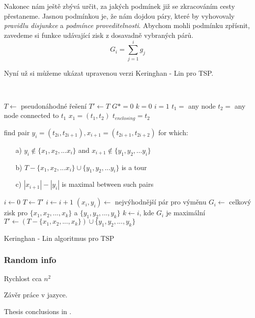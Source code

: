 \documentclass[
  biblatex,
  figures=false,
  glossaries,
  index
]{kidiplom}
\begin{document}
Nakonec nám ještě zbývá určit, za jakých podmínek již se zkracováním cesty přestaneme. Jasnou podmínkou je, že nám dojdou páry, které by vyhovovaly \textit{pravidlu disjunkce} a \textit{podmínce proveditelnosti}. Abychom mohli podmínku zpřísnit, zavedeme si funkce udávající zisk z dosavadně vybraných párů.
$$G_i = \sum_{j=1}^{i}g_j$$

Nyní už si můžeme ukázat upravenou verzi Keringhan - Lin pro TSP.
\newline

{\LinesNumbered\SetAlgoNoLine\
\begin{algorithm}[H]
%
$T \leftarrow$ pseudonáhodné řešení\;
$T' \leftarrow T$\;
$G* = 0$\;
$k = 0$
$i = 1$\;
$t_1 =$ any node\;
$t_2 =$ any node connected to $t_1$\;
$x_1 = (t_1, t_2)$\;
$t_{enclosing} = t_2$\;
{
find pair $y_i = (t_{2i}, t_{2i+1}), x_{i+1} = (t_{2i+1}, t_{2i+2})$ for which:
{\begin{itemize}
\item[a)] $y_i \notin \{x_1, x_2,... x_i\}$ and $x_{i+1} \notin \{y_1, y_2,... y_i\}$
\item[b)] $T - \{x_1, x_2,... x_i\} \cup \{y_1, y_2,... y_i\}$ is a tour
\item[c)] $|x_{i+1}| - |y_i|$ is maximal between such pairs
\end{itemize}}
$i \leftarrow 0$\;
$T \leftarrow T'$\;
{
$i \leftarrow i + 1$\;
$(x_i, y_i) \leftarrow$ nejvýhodnější pár pro výměnu\;
$G_i \leftarrow$ celkový zisk pro $\{x_1, x_2, ..., x_k\}$ a $\{y_1, y_2, ..., y_k\}$\;
}
$k \leftarrow i$, kde $G_i$ je maximální \;
$T' \leftarrow (T - \{x_1, x_2, ..., x_k\}) \cup \{y_1, y_2, ..., y_k\}$\;
}
\Return \;
\caption{Keringhan - Lin algoritmus pro TSP}
\end{algorithm}}\leavevmode\newline



\subsubsection{Random info}
Rychlost cca $n ^ 2$

\begin{kiconclusions}
Závěr práce v  jazyce.
\end{kiconclusions}

\begin{kiconclusions}[english]
Thesis conclusions in .
\end{kiconclusions}
\end{document}

